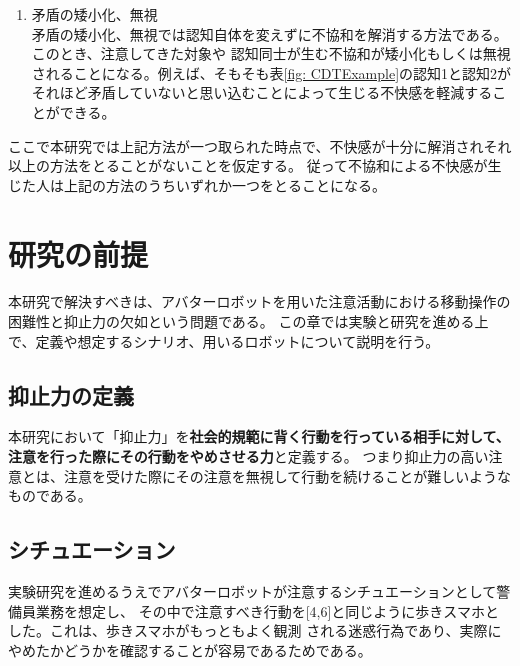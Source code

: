 \documentclass{kuisthesis}
\begin{document}
\begin{enumerate}
\begin{table}[H]
\end{table}

  \item 矛盾の矮小化、無視 \\
  矛盾の矮小化、無視では認知自体を変えずに不協和を解消する方法である。このとき、注意してきた対象や
  認知同士が生む不協和が矮小化もしくは無視されることになる。例えば、そもそも表\ref{fig: CDTExample}の認知1と認知2が
それほど矛盾していないと思い込むことによって生じる不快感を軽減することができる。

\end{enumerate}
\vspace{3mm}

ここで本研究では上記方法が一つ取られた時点で、不快感が十分に解消されそれ以上の方法をとることがないことを仮定する。
従って不協和による不快感が生じた人は上記の方法のうちいずれか一つをとることになる。

\section{研究の前提}
本研究で解決すべきは、アバターロボットを用いた注意活動における移動操作の困難性と抑止力の欠如という問題である。
この章では実験と研究を進める上で、定義や想定するシナリオ、用いるロボットについて説明を行う。

\subsection{抑止力の定義}
本研究において「抑止力」を\textbf{社会的規範に背く行動を行っている相手に対して、注意を行った際にその行動をやめさせる力}と定義する。
つまり抑止力の高い注意とは、注意を受けた際にその注意を無視して行動を続けることが難しいようなものである。

\subsection{シチュエーション}
実験研究を進めるうえでアバターロボットが注意するシチュエーションとして警備員業務を想定し、
その中で注意すべき行動を[4,6]と同じように歩きスマホとした。これは、歩きスマホがもっともよく観測
される迷惑行為であり、実際にやめたかどうかを確認することが容易であるためである。
\end{document}
